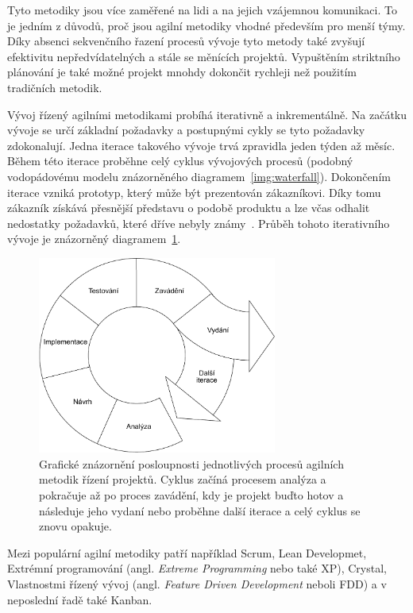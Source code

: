 Tyto metodiky jsou více zaměřené na lidi a na jejich vzájemnou komunikaci. To je jedním z důvodů, proč jsou agilní metodiky vhodné především pro menší týmy. Díky absenci sekvenčního řazení procesů vývoje tyto metody také zvyšují efektivitu nepředvídatelných a stále se měnících projektů. Vypuštěním striktního plánování je také možné projekt mnohdy dokončit rychleji než použitím tradičních metodik.

Vývoj řízený agilními metodikami probíhá iterativně a inkrementálně. Na začátku vývoje se určí základní požadavky a postupnými cykly se tyto požadavky zdokonalují. Jedna iterace takového vývoje trvá zpravidla jeden týden až měsíc. Během této iterace proběhne celý cyklus vývojových procesů (podobný vodopádovému modelu znázorněného diagramem~\ref{img:waterfall}). Dokončením iterace vzniká prototyp, který může být prezentován zákazníkovi. Díky tomu zákazník získává přesnější představu o podobě produktu a lze včas odhalit nedostatky požadavků, které dříve nebyly známy~\cite{bib:agile-impact}. 
Průběh tohoto iterativního vývoje je znázorněný diagramem~\ref{img:agile}.

\begin{figure}[H]
	\centering
	\includegraphics[width=0.7\textwidth]{obrazky-figures/agile.pdf}
	\caption{Grafické znázornění posloupnosti jednotlivých procesů agilních metodik řízení projektů. Cyklus začíná procesem analýza a pokračuje až po proces zavádění, kdy je projekt buďto hotov a následuje jeho vydaní nebo proběhne další iterace a celý cyklus se znovu opakuje.}
	\label{img:agile}
\end{figure}

Mezi populární agilní metodiky patří například Scrum, Lean Developmet, Extrémní programování (angl. \emph{Extreme Programming} nebo také XP), Crystal, Vlastnostmi řízený vývoj (angl. \emph{Feature Driven Development} neboli FDD) a v neposlední řadě také Kanban.


